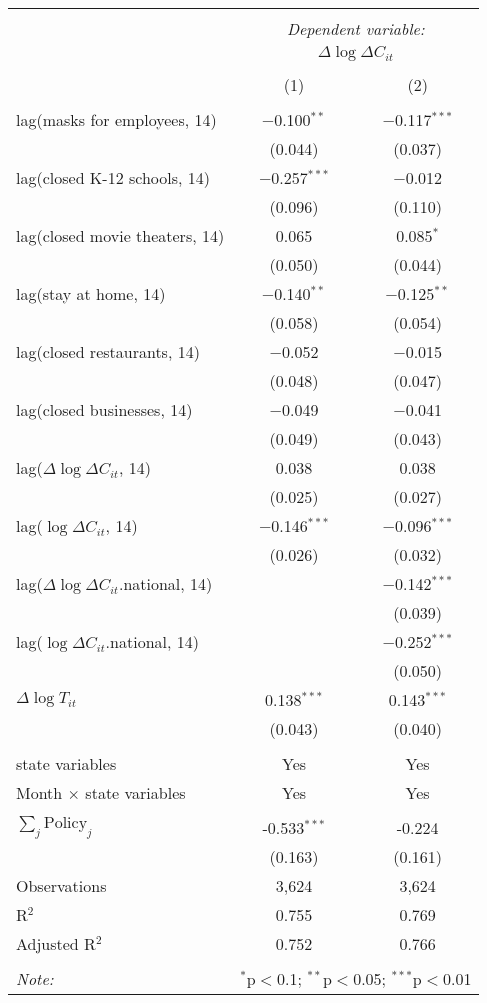 \begin{tabular}{@{\extracolsep{1pt}}lcc} 
\\[-1.8ex]\hline 
\hline \\[-1.8ex] 
 & \multicolumn{2}{c}{\textit{Dependent variable:}} \\ 
\cline{2-3} 
 & \multicolumn{2}{c}{$\Delta \log \Delta C_{it}$} \\ 
\\[-1.8ex] & (1) & (2)\\ 
\hline \\[-1.8ex] 
 lag(masks for employees, 14) & $-$0.100$^{**}$ & $-$0.117$^{***}$ \\ 
  & (0.044) & (0.037) \\ 
  lag(closed K-12 schools, 14) & $-$0.257$^{***}$ & $-$0.012 \\ 
  & (0.096) & (0.110) \\ 
  lag(closed movie theaters, 14) & 0.065 & 0.085$^{*}$ \\ 
  & (0.050) & (0.044) \\ 
  lag(stay at home, 14) & $-$0.140$^{**}$ & $-$0.125$^{**}$ \\ 
  & (0.058) & (0.054) \\ 
  lag(closed restaurants, 14) & $-$0.052 & $-$0.015 \\ 
  & (0.048) & (0.047) \\ 
  lag(closed businesses, 14) & $-$0.049 & $-$0.041 \\ 
  & (0.049) & (0.043) \\ 
  lag($\Delta \log \Delta C_{it}$, 14) & 0.038 & 0.038 \\ 
  & (0.025) & (0.027) \\ 
  lag($\log \Delta C_{it}$, 14) & $-$0.146$^{***}$ & $-$0.096$^{***}$ \\ 
  & (0.026) & (0.032) \\ 
  lag($\Delta \log \Delta C_{it}$.national, 14) &  & $-$0.142$^{***}$ \\ 
  &  & (0.039) \\ 
  lag($\log \Delta C_{it}$.national, 14) &  & $-$0.252$^{***}$ \\ 
  &  & (0.050) \\ 
  $\Delta \log T_{it}$ & 0.138$^{***}$ & 0.143$^{***}$ \\ 
  & (0.043) & (0.040) \\ 
 \hline \\[-1.8ex] 
state variables & Yes & Yes \\ 
Month $\times$ state variables & Yes & Yes \\ 
\hline \\[-1.8ex] 
$\sum_j \mathrm{Policy}_j$ & -0.533$^{***}$ & -0.224 \\ 
 & (0.163) & (0.161) \\ 
Observations & 3,624 & 3,624 \\ 
R$^{2}$ & 0.755 & 0.769 \\ 
Adjusted R$^{2}$ & 0.752 & 0.766 \\ 
\hline 
\hline \\[-1.8ex] 
\textit{Note:}  & \multicolumn{2}{r}{$^{*}$p$<$0.1; $^{**}$p$<$0.05; $^{***}$p$<$0.01} \\ 
\end{tabular} 